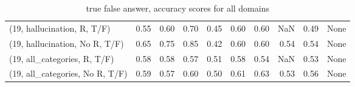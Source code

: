 \begin{table*}[h!]
\begin{adjustbox}{width=2\columnwidth,center}
\begin{tabular}{lrrr|rrr|rrr}
(19, hallucination, R, T/F)           &                      0.55 &                  0.60 &                      0.70 &                          0.45 &                      0.60 &                          0.60 &                                    NaN &                               0.49 &                                  None \\
(19, hallucination, No R, T/F)        &                      0.65 &                  0.75 &                      0.85 &                          0.42 &                      0.60 &                          0.60 &                                   0.54 &                               0.54 &                                  None \\
(19, all\_categories, R, T/F)          &                      0.58 &                  0.58 &                      0.57 &                          0.51 &                      0.58 &                          0.54 &                                    NaN &                               0.53 &                                  None \\
(19, all\_categories, No R, T/F)       &                      0.59 &                  0.57 &                      0.60 &                          0.50 &                      0.61 &                          0.63 &                                   0.53 &                               0.56 &                                  None \\


\bottomrule
\end{tabular}
\end{adjustbox}
\caption{true false answer, accuracy scores for all domains}
\end{table*}